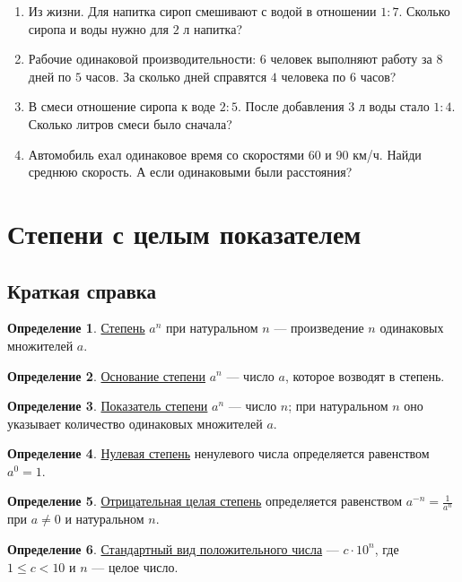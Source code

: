 \documentclass[12pt,a4paper]{article}
\theoremstyle{definition}
\newtheorem{definition}{Определение}[section]
\theoremstyle{plain}
\theoremstyle{remark}
\newcommand{\term}[1]{\uline{#1}}
\newcommand{\starmark}{\ensuremath{{}^{\ast}}}
\begin{document}
\begin{enumerate}[label=\thesection.\arabic*.,leftmargin=2.8em,itemsep=12pt]
\item Из жизни. Для напитка сироп смешивают с водой в отношении \(1 : 7\). Сколько сиропа и воды нужно для \(2\) л напитка?
\item[\textbf{5.16.}\starmark] Рабочие одинаковой производительности: \(6\) человек выполняют работу за \(8\) дней по \(5\) часов. За сколько дней справятся \(4\) человека по \(6\) часов?
\item[\textbf{5.17.}\starmark] В смеси отношение сиропа к воде \(2 : 5\). После добавления \(3\) л воды стало \(1 : 4\). Сколько литров смеси было сначала?
\item[\textbf{5.18.}\starmark] Автомобиль ехал одинаковое время со скоростями \(60\) и \(90\) км/ч. Найди среднюю скорость. А если одинаковыми были расстояния?
\end{enumerate}
\clearpage
\section{Степени с целым показателем}
\subsection*{Краткая справка}
\begin{definition}\term{Степень} \(a^{n}\) при натуральном \(n\) — произведение \(n\) одинаковых множителей \(a\).\end{definition}
\begin{definition}\term{Основание степени} \(a^{n}\) — число \(a\), которое возводят в степень.\end{definition}
\begin{definition}\term{Показатель степени} \(a^{n}\) — число \(n\); при натуральном \(n\) оно указывает количество одинаковых множителей \(a\).\end{definition}
\begin{definition}\term{Нулевая степень} ненулевого числа определяется равенством \(a^{0} = 1\).\end{definition}
\begin{definition}\term{Отрицательная целая степень} определяется равенством \(a^{- n} = \frac{1}{a^{n}}\) при \(a \ne  0\) и натуральном \(n\).\end{definition}
\begin{definition}\term{Стандартный вид положительного числа} — \(c \cdot  10^{n}\), где \(1 \le  c < 10\) и \(n\) — целое число.\end{definition}
\end{document}
